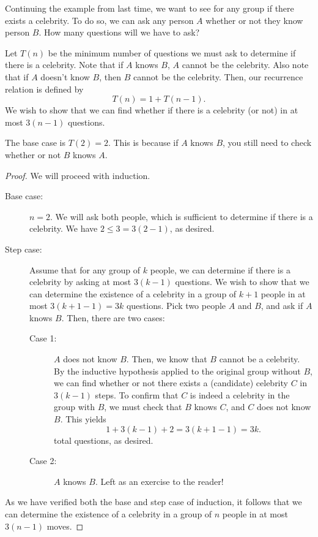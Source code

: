 
Continuing the example from last time, we want to see for any group if there exists a celebrity. To do so, we can ask any person \( A \) whether or not they know person \( B \). How many questions will we have to ask?

Let \( T(n) \) be the minimum number of questions we must ask to determine if there is a celebrity. Note that if \( A \) knows \( B \), \( A \) cannot be the celebrity. Also note that if \( A \) doesn't know \( B \), then \( B \) cannot be the celebrity. Then, our recurrence relation is defined by \[
	T(n) = 1 + T(n-1)
.\] We wish to show that we can find whether if there is a celebrity (or not) in at most \( 3(n-1) \) questions.

\begin{note}
	The base case is \( T(2) = 2 \). This is because if \( A \) knows \( B \), you still need to check whether or not \( B \) knows \( A \).
\end{note}

\begin{proof}
	We will proceed with induction. 
	\begin{description}
		\item[Base case:] \( n=2 \). We will ask both people, which is sufficient to determine if there is a celebrity. We have \( 2 \le  3 = 3(2-1) \), as desired.
		\item[Step case:] Assume that for any group of \( k \) people, we can determine if there is a celebrity by asking at most \( 3(k-1) \) questions. We wish to show that we can determine the existence of a celebrity in a group of \( k+1 \) people in at most \( 3(k+1-1) =3k \) questions. Pick two people \( A \) and \( B \), and ask if \( A \) knows \( B \). Then, there are two cases:
			\begin{description}
				\item[Case 1:] \( A  \) does not know \( B \). Then, we know that \( B \) cannot be a celebrity. By the inductive hypothesis applied to the original group without \( B \), we can find whether or not there exists a (candidate) celebrity \( C \) in \( 3(k-1) \) steps. To confirm that \( C \) is indeed a celebrity in the group with \( B \), we must check that \( B \) knows \( C \), and \( C \) does not know \( B \). This yields \[
						1 + 3(k-1) + 2 = 3(k+1-1) = 3k
					.\] total questions, as desired.
				\item[Case 2:] \( A \) knows \( B \). Left as an exercise to the reader!
			\end{description}
	\end{description}
	As we have verified both the base and step case of induction, it follows that we can determine the existence of a celebrity in a group of \( n \) people in at most \( 3(n-1) \) moves.
\end{proof}

